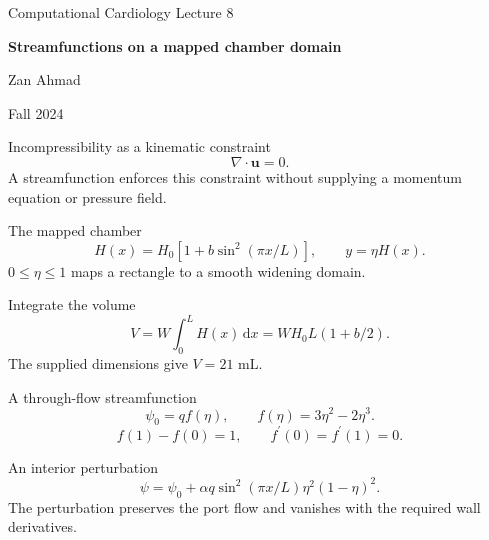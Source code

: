\documentclass[aspectratio=169,11pt]{beamer}
\newcommand{\notestarget}{notes.pdf}\newcommand{\noteslabel}{Notes}
\begin{document}
\begin{frame}[plain]\vfill
{\small\color{accent} Computational Cardiology \quad Lecture 8}\par\medskip
{\raggedright{}\LARGE\bfseries\color{ink} Streamfunctions on a mapped chamber domain}\par\bigskip
Zan Ahmad\par\smallskip
{\small Fall 2024}\par\vfill\end{frame}
\renewcommand{\notestarget}{notes.pdf\#note-prescribed-kinematics-and-the-unresolved-momentum-balance}
\begin{frame}[t,fragile,label=slide-incompressibility-as-a-kinematic-constraint]{Incompressibility as a kinematic constraint}
\[\nabla\cdot\boldsymbol u=0.\]\pause{} A streamfunction enforces this constraint without supplying a momentum equation or pressure field.
\end{frame}
\renewcommand{\notestarget}{notes.pdf\#note-a-widening-domain-and-its-volume}
\begin{frame}[t,fragile,label=slide-the-mapped-chamber]{The mapped chamber}
\[H(x)=H_0[1+b\sin^2(\pi x/L)],\qquad y=\eta H(x).\]\pause{} $0\le\eta\le1$ maps a rectangle to a smooth widening domain.
\end{frame}
\renewcommand{\notestarget}{notes.pdf\#note-a-widening-domain-and-its-volume}
\begin{frame}[t,fragile,label=slide-integrate-the-volume]{Integrate the volume}
\[V=W\int_0^L H(x)\,\mathrm dx=WH_0L(1+b/2).\]\pause{} The supplied dimensions give $V=21$ mL.
\end{frame}
\renewcommand{\notestarget}{notes.pdf\#note-streamfunction-construction-in-mapped-coordinates}
\begin{frame}[t,fragile,label=slide-a-through-flow-streamfunction]{A through-flow streamfunction}
\[\psi_0=qf(\eta),\qquad f(\eta)=3\eta^2-2\eta^3.\]\pause{}\[f(1)-f(0)=1,\qquad f^{\prime}(0)=f^{\prime}(1)=0.\]
\end{frame}
\renewcommand{\notestarget}{notes.pdf\#note-integrated-observations-and-interior-nonuniqueness}
\begin{frame}[t,fragile,label=slide-an-interior-perturbation]{An interior perturbation}
\[\psi=\psi_0+\alpha q\sin^2(\pi x/L)\eta^2(1-\eta)^2.\]\pause{} The perturbation preserves the port flow and vanishes with the required wall derivatives.
\end{frame}
\renewcommand{\notestarget}{notes.pdf\#note-streamfunction-construction-in-mapped-coordinates}
\end{document}
